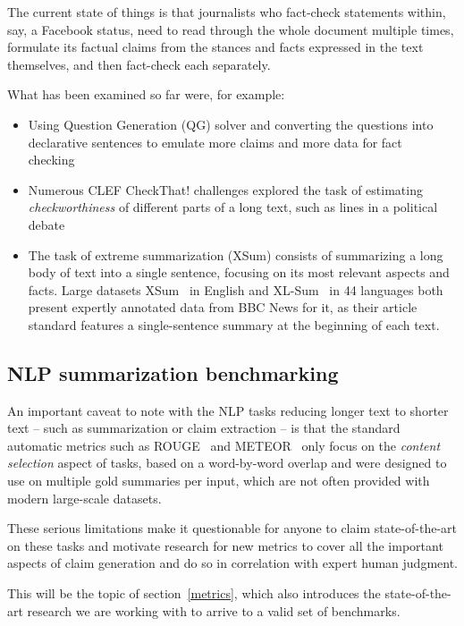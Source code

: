 The current state of things is that journalists who fact-check statements within, say, a Facebook status, need to read through the whole document multiple times, formulate its factual claims from the stances and facts expressed in the text themselves, and then fact-check each separately.

What has been examined so far were, for example:
\begin{itemize}
    \item Using Question Generation (QG) solver and converting the questions into declarative sentences to emulate more claims and more data for fact checking~\cite{pan2021zeroshot}
    \item Numerous CLEF CheckThat! challenges explored the task of estimating \textit{checkworthiness} of different parts of a long text, such as lines in a political debate~\cite{clef19,clef21}
    \item The task of extreme summarization (XSum) consists of summarizing a long body of text into a single sentence, focusing on its most relevant aspects and facts. Large datasets XSum~\cite{narayan-etal-2018-dont} in English and XL-Sum~\cite{xlsum} in 44 languages both present expertly annotated data from BBC News for it, as their article standard features a single-sentence summary at the beginning of each text.
\end{itemize}

\subsection{NLP summarization benchmarking}
\label{benchmarking-sota}
An important caveat to note with the NLP tasks reducing longer text to shorter text -- such as summarization or claim extraction -- is that the standard automatic metrics such as ROUGE~\cite{lin-2004-rouge} and METEOR~\cite{banerjee-lavie-2005-meteor} only focus on the \textit{content selection} aspect of tasks, based on a word-by-word overlap and were designed to use on multiple gold summaries per input, which are not often provided with modern large-scale datasets.~\cite{nlpprogress,bert-score,zha2023alignscore}

These serious limitations make it questionable for anyone to claim state-of-the-art on these tasks and motivate research for new metrics to cover all the important aspects of claim generation and do so in correlation with expert human judgment. 

This will be the topic of section~\ref{metrics}, which also introduces the state-of-the-art research we are working with to arrive to a valid set of benchmarks.